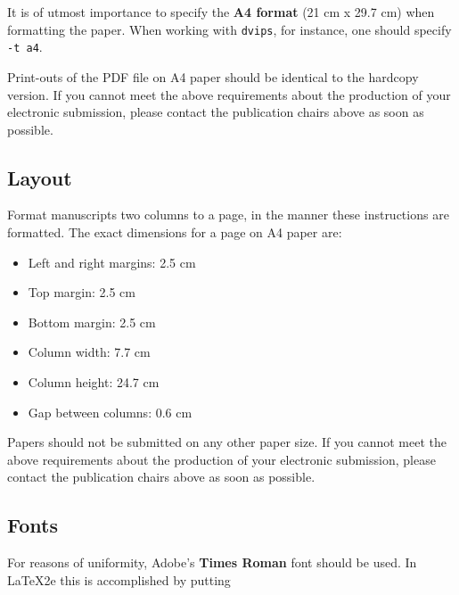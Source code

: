 \documentclass[11pt]{article}
\begin{document}
It is of utmost importance to specify the \textbf{A4 format} (21 cm
x 29.7 cm) when formatting the paper. When working with
{\tt dvips}, for instance, one should specify {\tt -t a4}.

Print-outs of the PDF file on A4 paper should be identical to the
hardcopy version. If you cannot meet the above requirements about the
production of your electronic submission, please contact the
publication chairs above as soon as possible.


\subsection{Layout}
\label{ssec:layout}

Format manuscripts two columns to a page, in the manner these
instructions are formatted. The exact dimensions for a page on A4
paper are:

\begin{itemize}
\item Left and right margins: 2.5 cm
\item Top margin: 2.5 cm
\item Bottom margin: 2.5 cm
\item Column width: 7.7 cm
\item Column height: 24.7 cm
\item Gap between columns: 0.6 cm
\end{itemize}

\noindent Papers should not be submitted on any other paper size.
 If you cannot meet the above requirements about the production of your electronic submission, please contact the publication chairs above as soon as possible.



\subsection{Fonts}

For reasons of uniformity, Adobe's {\bf Times Roman} font should be
used. In \LaTeX2e{} this is accomplished by putting
\end{document}
